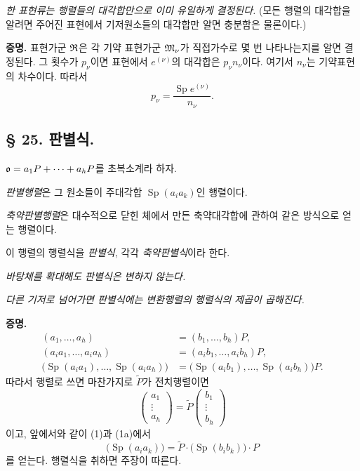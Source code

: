 \emph{한 표현류는 행렬들의 대각합만으로 이미 유일하게 결정된다.} (모든 행렬의 대각합을 알려면 주어진 표현에서 기저원소들의 대각합만 알면 충분함은 물론이다.)

\textbf{증명.} 표현가군 \(\mathfrak{R}\)은 각 기약 표현가군 \(\mathfrak M_\nu\)가 직접가수로 몇 번 나타나는지를 알면 결정된다. 그 횟수가 \(p_\nu\)이면 표현에서 \(e^{(\nu)}\)의 대각합은 \(p_\nu n_\nu\)이다. 여기서 \(n_\nu\)는 기약표현의 차수이다. 따라서
\[
        p_\nu=\frac{\operatorname{Sp}e^{(\nu)}}{n_\nu}.
\]

\subsection*{§ 25. 판별식.}

\(\mathfrak o=a_1P+\cdots+a_hP\)를 초복소계라 하자.

\noindent\emph{판별행렬}은 그 원소들이 주대각합 \(\operatorname{Sp}(a_i a_k)\)인 행렬이다.

\noindent\emph{축약판별행렬}은 대수적으로 닫힌 체에서 만든 축약대각합에 관하여 같은 방식으로 얻는 행렬이다.

이 행렬의 행렬식을 \emph{판별식}, 각각 \emph{축약판별식}이라 한다.

\noindent\emph{바탕체를 확대해도 판별식은 변하지 않는다.}

\noindent\emph{다른 기저로 넘어가면 판별식에는 변환행렬의 행렬식의 제곱이 곱해진다.}

\textbf{증명.}
\begin{align*}
(a_1,\ldots,a_h)&=(b_1,\ldots,b_h)P,\\
(a_i a_1,\ldots,a_i a_h)&=(a_i b_1,\ldots,a_i b_h)P,\\
\bigl(\operatorname{Sp}(a_i a_1),\ldots,
      \operatorname{Sp}(a_i a_h)\bigr)
&=\bigl(\operatorname{Sp}(a_i b_1),\ldots,
        \operatorname{Sp}(a_i b_h)\bigr)P.
\end{align*}
따라서 행렬로 쓰면
마찬가지로 \(\widetilde P\)가 전치행렬이면
\[
\begin{pmatrix}a_1\\[-1mm]\vdots\\[-1mm]a_h\end{pmatrix}
=\widetilde P
\begin{pmatrix}b_1\\[-1mm]\vdots\\[-1mm]b_h\end{pmatrix}
\]
이고, 앞에서와 같이
(1)과 (1a)에서
\[
\bigl(\operatorname{Sp}(a_i a_k)\bigr)
=\widetilde P\cdot
 \bigl(\operatorname{Sp}(b_i b_k)\bigr)\cdot P
\]
를 얻는다. 행렬식을 취하면 주장이 따른다.


